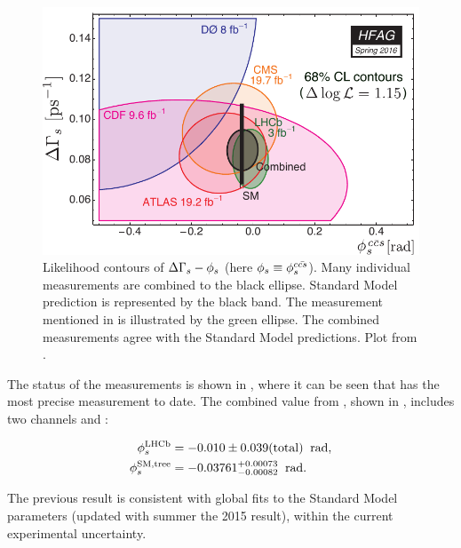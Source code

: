 \begin{figure}[h]
  \centering
    \includegraphics[trim=0cm 0cm 0cm 0cm, clip=true, scale=0.8]{Figures/Chapter1/hfag_Spring2016_DGsphis_zoom.pdf}
    \caption{Likelihood contours of $\Delta\Gamma_s-\phi_{s}$ (here $\phi_{s}\equiv \phi_{s}^{c\bar{cs}}$). Many individual measurements are
             combined to the black ellipse. Standard Model prediction is represented by the black band. The \lhcb measurement
             mentioned in  is illustrated by the green ellipse. The combined measurements agree with the Standard Model
             predictions. Plot from \cite{hfag-2014}. }
    \label{hfag_phis_dg}
\end{figure}

The status of the \phis measurements is shown in , where it can be seen that \lhcb has
the most precise measurement to date. The combined \phis value from \lhcb \cite{phis-3fb-paper}, shown in
, includes two channels \BsJpsiPhi and \BsJpsipipi:

\begin{subequations}
  \label{phis_lhcb_theo}
  \begin{align}
  \centering
  \phiS{\lhcb}           &=  -0.010 \pm 0.039(\text{total})  \;\; \text{rad},
  \label{phis_lhcb}\\
  \phiS{SM,tree}  &= -0.03761 {}^{+0.00073}_{-0.00082}  \;\; \text{rad}.
  \label{phis_theo}
\end{align}
\end{subequations}

\noindent The previous result is consistent with global fits to the Standard Model parameters
 \cite{ckm-fitter-phis-pred} (updated with summer the 2015 result), within the current experimental uncertainty.


